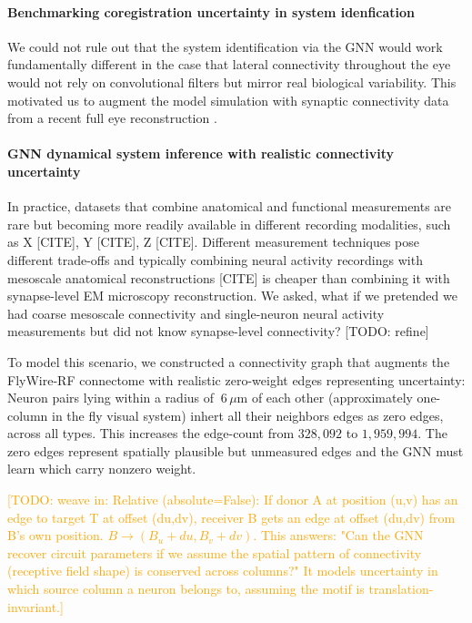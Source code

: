 \documentclass{article}
\newcommand{\comment}[1]{\textcolor{orange}{[#1]}}
\begin{document}
\paragraph{Benchmarking coregistration uncertainty in system idenfication}

We could not rule out that the system identification via the GNN would work fundamentally different in the case that lateral connectivity throughout the eye would not rely on convolutional filters but mirror real biological variability. This motivated us to augment the model simulation with synaptic connectivity data from a recent full eye reconstruction \citep{dorkenwald_neuronal_2024, schlegel}. 

\paragraph{GNN dynamical system inference with realistic connectivity uncertainty}


In practice, datasets that combine anatomical and functional measurements are rare but becoming more readily available in different recording modalities, such as X [CITE], Y [CITE], Z [CITE]. Different measurement techniques pose different trade-offs and typically combining neural activity recordings with mesoscale anatomical reconstructions [CITE] is cheaper than combining it with synapse-level EM microscopy reconstruction. We asked, what if we pretended we had coarse mesoscale connectivity and single-neuron neural activity measurements but did not know synapse-level connectivity? [TODO: refine]

To model this scenario, we constructed a connectivity graph that augments the FlyWire-RF connectome with realistic zero-weight edges representing uncertainty: Neuron pairs lying within a radius of $~6\,\mu\text{m}$ of each other (approximately one-column in the fly visual system) inhert all their neighbors edges as zero edges, across all types. This increases the edge-count from $328,092$ to $1,959,994$. The zero edges represent spatially plausible but unmeasured edges and the GNN must learn which carry nonzero weight. 

\comment{TODO: weave in: Relative (absolute=False): If donor A at position (u,v) has an edge to target T at offset (du,dv), receiver B gets an edge at offset (du,dv) from B's own position. $B\rightarrow (B_u+du, B_v+dv)$. This answers: "Can the GNN recover circuit parameters if we assume the spatial pattern of connectivity (receptive field shape) is conserved across columns?" It models uncertainty in which source column a neuron belongs to, assuming the motif is translation-invariant.}
\end{document}
